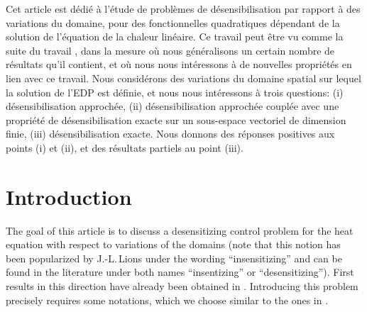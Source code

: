 \documentclass[JEP,XML,SOM,Unicode,NoFloatCountersInSection]{cedram}
\newcounter{question}
\theoremstyle{definition}
\begin{document}




\begin{altabstract}
Cet article est dédié à l'étude de problèmes de désensibilisation par rapport à des variations du domaine, pour des fonctionnelles quadratiques dépendant de la solution de l'équation de la chaleur linéaire. Ce travail peut être vu comme la suite du travail \cite{Lissy-Privat-Simpore}, dans la mesure où nous généralisons un certain nombre de résultats qu'il contient, et où nous nous intéressons à de nouvelles propriétés en lien avec ce travail. Nous considérons des variations du domaine spatial sur lequel la solution de l'EDP est définie, et nous nous intéressons à trois questions:
(i) désensibilisation approchée,
(ii) désensibilisation approchée couplée avec une propriété de désensibilisation exacte sur un sous-espace vectoriel de dimension finie,
(iii) désensibilisation exacte.
Nous donnons des réponses positives aux points (i) et (ii), et des résultats partiels au point (iii).
\end{altabstract}

\maketitle
\vspace*{-\baselineskip}
\tableofcontents
\mainmatter

\section{Introduction}

The goal of this article is to discuss a desensitizing control problem for the heat equation with respect to variations of the domains (note that this notion has been popularized by J.-L.\,Lions \cite{Lions-1990} under the wording ``insensitizing'' and can be found in the literature under both names ``insentizing'' or ``desensitizing''). First results in this direction have already been obtained in \cite{Lissy-Privat-Simpore}. Introducing this problem precisely requires some notations, which we choose similar to the ones in \cite{Lissy-Privat-Simpore}.
\end{document}
